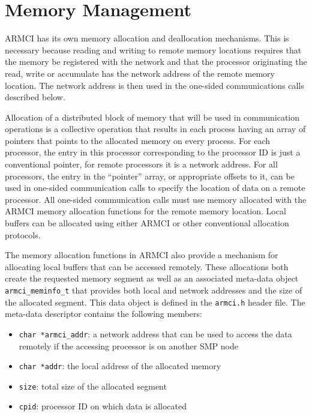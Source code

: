 \documentclass[12pt]{article}
\begin{document}
\section{Memory Management}
ARMCI has its own memory allocation and deallocation mechanisms. This is
necessary because reading and writing to remote memory locations requires that
the memory be registered with the network and that the processor originating the
read, write or accumulate has the network address of the remote memory location.
The network address is then used in the one-sided communications calls described
below.

Allocation of a distributed block of memory that will be used in communication
operations is a collective operation that results in each process having an
array of pointers that points to the allocated memory on every process. For each
processor, the entry in this processor corresponding to the processor ID is just
a conventional pointer, for remote processors it is a network address. For all
processors, the entry in the ``pointer'' array, or appropriate offsets to it,
can be used in one-sided communication calls to specify the location of data on
a remote processor. All one-sided communication calls must use memory allocated
with the ARMCI memory allocation functions for the remote memory location. Local
buffers can be allocated using either ARMCI or other conventional
allocation protocols.

The memory allocation functions in ARMCI also provide a mechanism for allocating
local buffers that can be accessed remotely. These allocations both create the
requested memory segment as well as an associated meta-data object
\texttt{armci\_meminfo\_t} that provides both local and network addresses and the
size of the allocated segment. This data object is defined in the \texttt{armci.h}
header file. The meta-data descriptor contains the following members:
\begin{itemize}
\item{\texttt{char *armci\_addr}}: a network address that can be used to
access the data remotely if the accessing processor is on another SMP node
\item{\texttt{char *addr}}: the local address of the allocated memory
\item{\texttt{size}}: total size of the allocated segment
\item{\texttt{cpid}}: processor ID on which data is allocated
\end{itemize}
\end{document}
